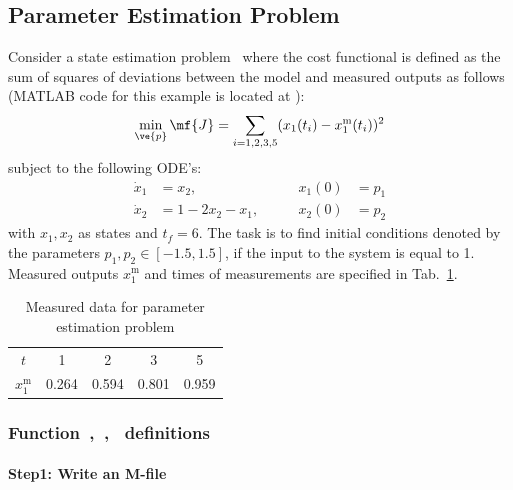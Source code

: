 \subsection{Parameter Estimation Problem}
\label{sec:pep}

Consider a state estimation problem~\cite{fik02} where the cost
functional is defined as the sum of squares of deviations between the
model and measured outputs as follows (MATLAB code for this example is
located at ):
\begin{equation}
\min_{\ve{p}} \mf{J} =
\sum_{i=1,2,3,5}(x_{1}(t_{i})-x_{1}^{\text{m}}(t_{i}))^{2}
\label{eq:pep}  
\end{equation}
subject to the following ODE's:
\begin{align}
\dot{x}_{1} &= x_{2}, &\qquad x_{1}(0) &= p_{1} \\
\dot{x}_{2} &= 1 - 2x_{2} - x_{1}, &\qquad x_{2}(0) &= p_{2}
\end{align} with $x_{1}, x_{2}$ as states and $t_f = 6$.
The task is to find initial conditions denoted by the parameters
$p_{1}, p_{2} \in [-1.5,1.5]$, if the input to the system is equal to
1. Measured outputs $x_{1}^{\text{m}}$ and times of measurements are
specified in Tab.~\ref{tab:measureddatas}.  

\begin{table}[h]
  \begin{center}
    \begin{tabular}{|c|c|c|c|c|}
      \hline
      $t$ & 1 & 2 & 3 & 5\\
      $x_{1}^{\text{m}}$ & 0.264 & 0.594 & 0.801 & 0.959\\
      \hline
    \end{tabular}
  \end{center}
  \caption{Measured data for parameter estimation problem}
  \label{tab:measureddatas} 
\end{table}
 
\subsubsection{Function~,~,~  definitions}

\paragraph{Step1: Write an M-file }

{\small }

